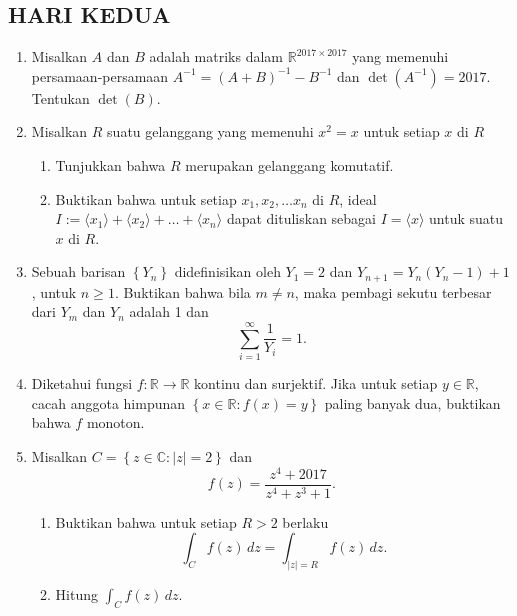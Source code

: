 \documentclass[12pt,twoside]{article}
\begin{document}
\subsection{HARI KEDUA}
\begin{enumerate}
    \item Misalkan $A$ dan $B$ adalah matriks dalam $\mathbb{R}^{2017\times2017}$ yang memenuhi persamaan-persamaan $A^{-1} = (A+B)^{-1}-B^{-1}$	dan $\det(A^{-1}) = 2017$. Tentukan $\det(B)$.

    \item Misalkan $R$ suatu gelanggang yang memenuhi $x^2=x$ untuk setiap $x$ di $R$
          \begin{enumerate}
              \item Tunjukkan bahwa $R$ merupakan gelanggang komutatif.
              \item Buktikan bahwa untuk setiap $x_1,x_2, \dots x_n$ di $R$, ideal $I := \langle x_1\rangle+\langle x_2 \rangle+\dots+\langle x_n \rangle$ dapat dituliskan sebagai $I = \langle x \rangle$ untuk suatu $x$ di $R$.
          \end{enumerate}


    \item Sebuah barisan $\left\lbrace Y_n \right\rbrace$ didefinisikan oleh $Y_1 = 2$ dan $Y_{n+1} = Y_n(Y_n-1)+1$, untuk $n \geq 1.$ Buktikan bahwa bila $m \not= n$, maka pembagi sekutu terbesar dari $Y_m$ dan $Y_n$ adalah 1 dan
          \begin{equation*}
              \displaystyle\sum_{i = 1}^{\infty} \dfrac{1}{Y_i} = 1.
          \end{equation*}


    \item Diketahui fungsi $f : \mathbb{R}\to\mathbb{R}$ kontinu dan surjektif. Jika untuk setiap $y \in \mathbb{R}$, cacah anggota himpunan $\left\lbrace x\in\mathbb{R} : f(x) = y \right\rbrace$ paling banyak dua, buktikan bahwa $f$ monoton.


    \item Misalkan $C = \left\lbrace z \in \mathbb{C} : |z|=2 \right\rbrace$ dan
          \begin{equation*}
              f(z) = \dfrac{z^4+2017}{z^4+z^3+1}.
          \end{equation*}
          \begin{enumerate}
              \item Buktikan bahwa untuk setiap $R>2$ berlaku
                    \begin{equation*}
                        \displaystyle\int_{C}^{} f(z)\,dz = \displaystyle\int_{|z|=R}^{}f(z)\,dz.
                    \end{equation*}
              \item Hitung $\displaystyle\int_{C}^{}f(z)\,dz$.
          \end{enumerate}
\end{enumerate}
\pagebreak
\end{document}
